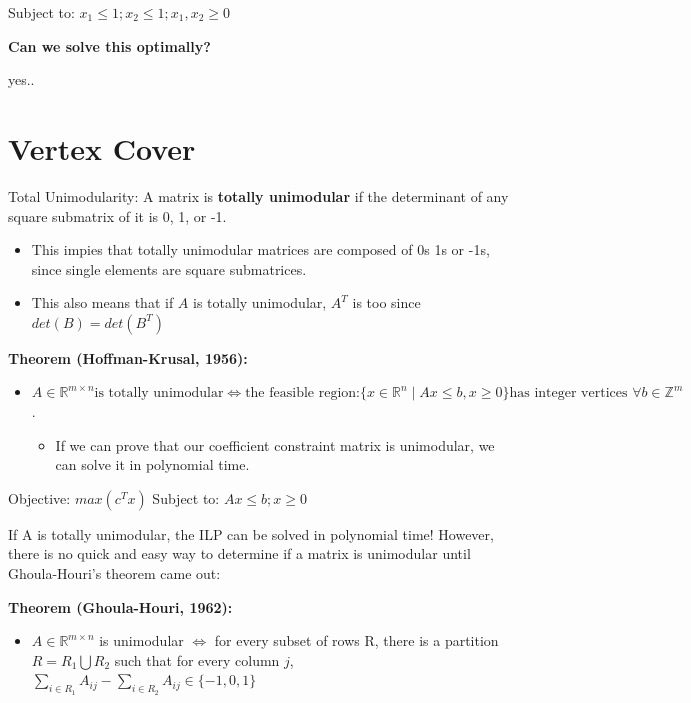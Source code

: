 \documentclass[11pt]{article}
\begin{document}
Subject to: \(x_1 \leq 1 ; x_2  \leq 1 ; x_1, x_2 \geq 0\)


\textbf{\textbf{Can we solve this optimally?}}

yes..


\section{Vertex Cover}
\label{sec:org2f9b326}


Total Unimodularity: A matrix is \textbf{\textbf{totally unimodular}} if the determinant of any square submatrix of it is 0, 1, or -1.

\begin{itemize}
\item This impies that totally unimodular matrices are composed of 0s 1s or -1s, since single elements are square submatrices.
\item This also means that if \(A\) is totally unimodular, \(A^T\) is too since \(det(B) = det(B^T)\)
\end{itemize}


\textbf{\textbf{Theorem (Hoffman-Krusal, 1956):}}
\begin{itemize}
\item \(A \in \mathbb{R}^{m \times n} \text{is totally unimodular} \iff \text{the feasible region:} \{x \in \mathbb{R}^n \mid Ax \leq b, x \geq 0 \} \text{has integer vertices } \forall b \in \mathbb{Z}^m\).

\begin{itemize}
\item If we can prove that our coefficient constraint matrix is unimodular, we can solve it in polynomial time.
\end{itemize}
\end{itemize}

Objective: \(max(c^T x)\)
Subject to: \(A x \leq b ; x \geq 0\)

If A is totally unimodular, the ILP can be solved in polynomial time! However, there is no quick and easy way to determine if a matrix is unimodular until Ghoula-Houri's theorem came out:

\textbf{\textbf{Theorem (Ghoula-Houri, 1962):}}

\begin{itemize}
\item \(A \in \mathbb{R}^{m \times n}\) is unimodular \(\iff\) for every subset of rows R, there is a partition \(R = R_1 \bigcup R_2\) such that for every column \(j\), \(\sum_{i \in R_1} A_{ij} - \sum_{i \in R_2} A_{ij} \in \{-1, 0, 1\}\)
\end{itemize}
\end{document}
